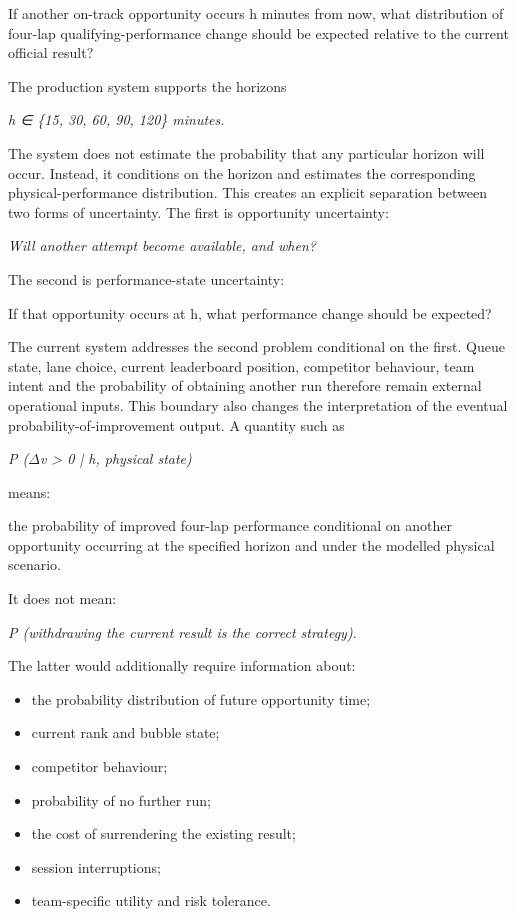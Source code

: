 If another on-track opportunity occurs h minutes from now, what distribution of four-lap qualifying-performance change should be expected relative to the current official result?

The production system supports the horizons

\begin{center}\textit{h ∈ \{15, 30, 60, 90, 120\} minutes.}\end{center}

The system does not estimate the probability that any particular horizon will occur. Instead, it conditions on the horizon and estimates the corresponding physical-performance distribution. This creates an explicit separation between two forms of uncertainty. The first is opportunity uncertainty:

\begin{center}\textit{Will another attempt become available, and when?}\end{center}

The second is performance-state uncertainty:

If that opportunity occurs at h, what performance change should be expected?

The current system addresses the second problem conditional on the first. Queue state, lane choice, current leaderboard position, competitor behaviour, team intent and the probability of obtaining another run therefore remain external operational inputs. This boundary also changes the interpretation of the eventual probability-of-improvement output. A quantity such as

\begin{center}\textit{P (\ensuremath{\Delta}v > 0 | h, physical state)}\end{center}

means:

the probability of improved four-lap performance conditional on another opportunity occurring at the specified horizon and under the modelled physical scenario.

It does not mean:

\begin{center}\textit{P (withdrawing the current result is the correct strategy).}\end{center}

The latter would additionally require information about:

\begin{itemize}
\item the probability distribution of future opportunity time;
\item current rank and bubble state;
\item competitor behaviour;
\item probability of no further run;
\item the cost of surrendering the existing result;
\item session interruptions;
\item team-specific utility and risk tolerance.
\end{itemize}

